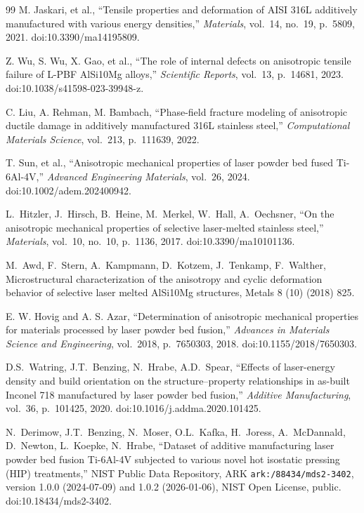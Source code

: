 \begin{thebibliography}{99}
M. Jaskari, et al., ``Tensile properties and deformation of AISI 316L additively manufactured with various energy densities,'' \textit{Materials}, vol.~14, no.~19, p.~5809, 2021. doi:10.3390/ma14195809.

Z. Wu, S. Wu, X. Gao, et al., ``The role of internal defects on anisotropic tensile failure of L-PBF AlSi10Mg alloys,'' \textit{Scientific Reports}, vol.~13, p.~14681, 2023. doi:10.1038/s41598-023-39948-z.

C. Liu, A. Rehman, M. Bambach, ``Phase-field fracture modeling of anisotropic ductile damage in additively manufactured 316L stainless steel,'' \textit{Computational Materials Science}, vol.~213, p.~111639, 2022.

T. Sun, et al., ``Anisotropic mechanical properties of laser powder bed fused Ti-6Al-4V,'' \textit{Advanced Engineering Materials}, vol.~26, 2024. doi:10.1002/adem.202400942.

L.~Hitzler, J.~Hirsch, B.~Heine, M.~Merkel, W.~Hall, A.~Oechsner, ``On the anisotropic mechanical properties of selective laser-melted stainless steel,'' \textit{Materials}, vol.~10, no.~10, p.~1136, 2017. doi:10.3390/ma10101136.

M.~Awd, F.~Stern, A.~Kampmann, D.~Kotzem, J.~Tenkamp, F.~Walther, Microstructural characterization of the anisotropy and cyclic deformation behavior of selective laser melted AlSi10Mg structures, Metals 8 (10) (2018) 825.

E. W. Hovig and A. S. Azar, ``Determination of anisotropic mechanical properties for materials processed by laser powder bed fusion,'' \textit{Advances in Materials Science and Engineering}, vol.~2018, p.~7650303, 2018. doi:10.1155/2018/7650303.

D.S.~Watring, J.T.~Benzing, N.~Hrabe, A.D.~Spear, ``Effects of laser-energy density and build orientation on the structure--property relationships in as-built Inconel 718 manufactured by laser powder bed fusion,'' \textit{Additive Manufacturing}, vol.~36, p.~101425, 2020. doi:10.1016/j.addma.2020.101425.

N.~Derimow, J.T.~Benzing, N.~Moser, O.L.~Kafka, H.~Joress, A.~McDannald, D.~Newton, L.~Koepke, N.~Hrabe, ``Dataset of additive manufacturing laser powder bed fusion Ti-6Al-4V subjected to various novel hot isostatic pressing (HIP) treatments,'' NIST Public Data Repository, ARK \texttt{ark:/88434/mds2-3402}, version 1.0.0 (2024-07-09) and 1.0.2 (2026-01-06), NIST Open License, public. doi:10.18434/mds2-3402.


\end{thebibliography}
